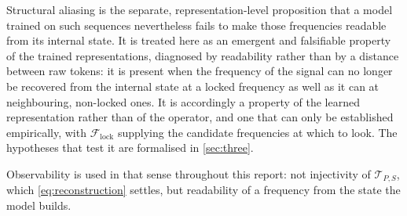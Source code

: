 Structural aliasing is the separate, representation-level proposition that a model trained on such sequences nevertheless fails to make those frequencies readable from its internal state. It is treated here as an emergent and falsifiable property of the trained representations\autocite{paganiPreliminaryInsightsChronos2026}, diagnosed by readability rather than by a distance between raw tokens: it is present when the frequency of the signal can no longer be recovered from the internal state at a locked frequency as well as it can at neighbouring, non-locked ones. It is accordingly a property of the learned representation rather than of the operator, and one that can only be established empirically, with $\mathcal{F}_{\mathrm{lock}}$ supplying the candidate frequencies at which to look. The hypotheses that test it are formalised in \autoref{sec:three}.

Observability is used in that sense throughout this report: not injectivity of $\mathcal{T}_{P,S}$, which \autoref{eq:reconstruction} settles, but readability of a frequency from the state the model builds.